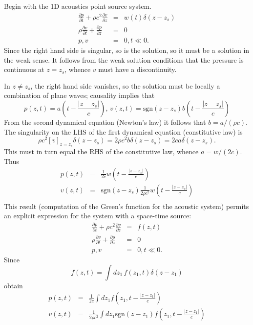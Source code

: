 Begin with the 1D acoustics point source system. 
\begin{eqnarray}
\label{eqn:awe1dptsrc}
\frac{\partial p}{\partial t} +\rho c^2\frac{\partial 
  v}{\partial z} &=& w(t)\delta(z-z_s) \nonumber\\
\rho \frac{\partial v}{\partial t} + \frac{\partial p}{\partial 
  z}&=&0\nonumber\\
 p,v&=&0, t \ll 0. 
\end{eqnarray}
Since the right hand side is singular, so is the solution, so it must
be a solution in the weak sense. It follows from the weak solution
conditions that the pressure is continuous at $z=z_s$, whence $v$ must
have a discontinuity. 

In $z \ne z_s$, the right hand side 
vanishes, so the solution must be locally a combination of plane
waves; causality implies that
\[
p(z,t)=a\left(t -\frac{|z-z_s|}{c}\right), \, v(z,t)=\mbox{sgn}(z-z_s) b\left(t -
  \frac{|z-z_s|}{c}\right)
\]
From the second dynamical equation (Newton's law) it follows that $b =
a/(\rho c)$. The singularity on the LHS of the first dynamical
equation (constitutive law) is
\[
\rho c^2 [v]_{z=z_s}\delta(z-z_s) =
2\rho c^2 b\delta(z-z_s) = 2c a\delta(z-z_s).
\] 
This must in turn equal the RHS of the constitutive law, whence
$a=w/(2c)$. Thus
\begin{eqnarray}
\label{eqn:sol1dptsrc}
p(z,t) &=& \frac{1}{2c}w\left(t - \frac{|z-z_s|}{c}\right) \nonumber \\
v(z,t) &=& \mbox{sgn}(z-z_s)\frac{1}{2\rho c^2}w\left(t -\frac{|z-z_s|}{c}\right)
           \nonumber \\
\end{eqnarray}
This result (computation of the Green's function for the acoustic
system) permits an explicit expression for the system with a
space-time source:
\begin{eqnarray}
\label{eqn:awe1d}
\frac{\partial p}{\partial t} +\rho c^2\frac{\partial 
  v}{\partial z} &=& f(z,t) \nonumber\\
\rho \frac{\partial v}{\partial t} + \frac{\partial p}{\partial 
  z}&=&0\nonumber\\
 p,v&=&0, t \ll 0. 
\end{eqnarray}
Since
\[
  f(z,t) = \int dz_1\,f(z_1,t)\delta(z-z_1)
\]
obtain
\begin{eqnarray}
\label{eqn:sol1dp}
p(z,t) &=& \frac{1}{2c}\int dz_1 f\left(z_1,t -
           \frac{|z-z_1|}{c}\right) \\
  \label{eqn:sol1dv}
v(z,t) &=& \frac{1}{2\rho c^2} \int dz_1 \mbox{sgn} (z-z_1) f\left(z_1,t - \frac{|z-z_1|}{c}\right)
\end{eqnarray}

